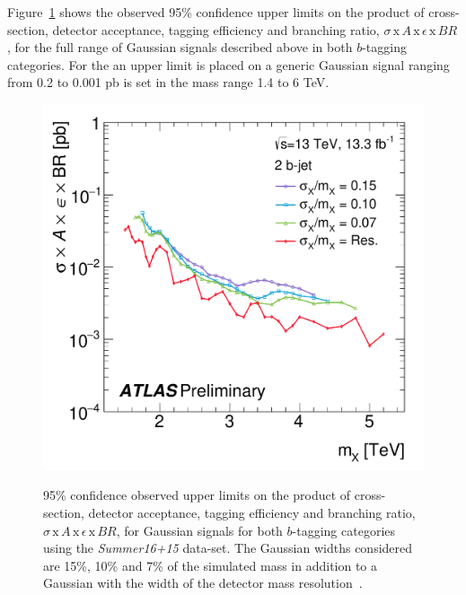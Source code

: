 Figure~\ref{fig:lim-summer_gauss} shows the observed 95\% confidence upper limits
on the product of cross-section, detector acceptance, tagging efficiency and branching ratio,
$\sigma\,\text{x}\,\mathit{A}\,\text{x}\,\epsilon\,\text{x}\,\mathit{BR}$,
for the full range of Gaussian signals described above in both $b$-tagging categories.
For the \summer{} an upper limit is placed on a generic Gaussian signal
ranging from 0.2 to 0.001 pb is set in the mass range 1.4 to 6 TeV.

\begin{figure}[!ht]
  \begin{center}
    \captionsetup[subfigure]{aboveskip=0pt,justification=centering}
         {\includegraphics[width=0.47\linewidth, angle=0]{figs/Dibjet/ICHEP/lim-summer_gauss_bb.pdf}}
  \end{center}
  \caption[95\% confidence observed upper limits
    on the product of cross-section, detector acceptance, tagging efficiency and branching ratio,
    $\sigma\,\text{x}\,\mathit{A}\,\text{x}\,\epsilon\,\text{x}\,\mathit{BR}$,
    for Gaussian signals for both $b$-tagging categories using the \textit{Summer16+15} data-set.
    The Gaussian widths considered are 15\%, 10\% and 7\% of the simulated mass
    in addition to a Gaussian with the width of the detector mass resolution.]
  {95\% confidence observed upper limits
    on the product of cross-section, detector acceptance, tagging efficiency and branching ratio,
    $\sigma\,\text{x}\,\mathit{A}\,\text{x}\,\epsilon\,\text{x}\,\mathit{BR}$,
    for Gaussian signals for both $b$-tagging categories using the \textit{Summer16+15} data-set.
    The Gaussian widths considered are 15\%, 10\% and 7\% of the simulated mass
    in addition to a Gaussian with the width of the detector mass resolution~\cite{dibjet-ichep_conf}.
  }
  \label{fig:lim-summer_gauss}
\end{figure}

